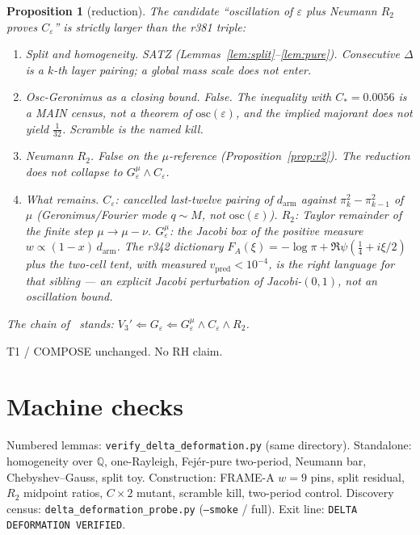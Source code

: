 \documentclass[11pt]{article}
\newtheorem{prop}{Proposition}
\theoremstyle{remark}
\newcommand{\Q}{\mathbb{Q}}
\begin{document}
\begin{prop}[reduction]\label{prop:red}
The candidate ``oscillation of $\varepsilon$ plus Neumann $R_2$ proves
$C_\varepsilon$'' is strictly larger than the r381 triple:
\begin{enumerate}
\item \emph{Split and homogeneity.}  SATZ
  (Lemmas~\ref{lem:split}--\ref{lem:pure}).
  Consecutive $\Delta$ is a $k$-th layer pairing; a global mass scale
  does not enter.
\item \emph{Osc-Geronimus as a closing bound.}  False.
  The inequality with $C_*=0.0056$ is a MAIN census, not a theorem of
  $\mathrm{osc}(\varepsilon)$, and the implied majorant does not yield
  $\tfrac1{32}$.  Scramble is the named kill.
\item \emph{Neumann $R_2$.}  False on the $\mu$-reference
  (Proposition~\ref{prop:r2}).  The reduction does not collapse to
  $G_\varepsilon^\mu\wedge C_\varepsilon$.
\item \emph{What remains.}
  $C_\varepsilon$: cancelled last-twelve pairing of $d_{\mathrm{arm}}$
  against $\pi_k^2-\pi_{k-1}^2$ of $\mu$ (Geronimus/Fourier mode
  $q\sim M$, not $\mathrm{osc}(\varepsilon)$).
  $R_2$: Taylor remainder of the finite step $\mu\to\mu-\nu$.
  $G_\varepsilon^\mu$: the Jacobi box of the positive measure
  $w\propto(1-x)\,d_{\mathrm{arm}}$.  The r342 dictionary
  $F_A(\xi)=-\log\pi+\Re\psi(\tfrac14+i\xi/2)$ plus the two-cell tent,
  with measured $v_{\mathrm{pred}}<10^{-4}$, is the right language for
  that sibling --- an explicit Jacobi perturbation of Jacobi-$(0,1)$,
  not an oscillation bound.
\end{enumerate}
The chain of~\cite{v3p,r381} stands:
$V_3'\Longleftarrow G_\varepsilon\Longleftarrow
G_\varepsilon^\mu\wedge C_\varepsilon\wedge R_2$.
\end{prop}

T1 / COMPOSE unchanged.  No RH claim.

\section{Machine checks}\label{sec:machine}

Numbered lemmas: \texttt{verify\_delta\_deformation.py}
(same directory).  Standalone: homogeneity over $\Q$, one-Rayleigh,
Fej\'er-pure two-period, Neumann bar, Chebyshev--Gauss, split toy.
Construction: FRAME-A $w=9$ pins, split residual, $R_2$ midpoint
ratios, $C\times 2$ mutant, scramble kill, two-period control.
Discovery census: \texttt{delta\_deformation\_probe.py}
(\texttt{--smoke} / full).
Exit line: \texttt{DELTA DEFORMATION VERIFIED}.
\end{document}

